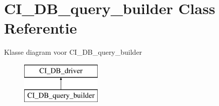 \hypertarget{class_c_i___d_b__query__builder}{}\section{C\+I\+\_\+\+D\+B\+\_\+query\+\_\+builder Class Referentie}
\label{class_c_i___d_b__query__builder}
Klasse diagram voor C\+I\+\_\+\+D\+B\+\_\+query\+\_\+builder\begin{figure}[H]
\begin{center}
\leavevmode
\includegraphics[height=2.000000cm]{class_c_i___d_b__query__builder}
\end{center}
\end{figure}
